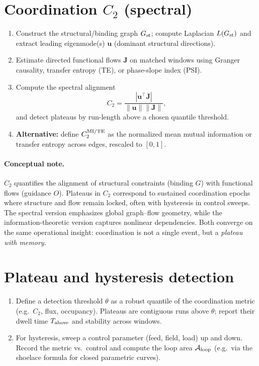 \documentclass[12pt,a4paper,oneside]{scrreprt}
\begin{document}
\section*{Coordination $C_2$ (spectral)}
\begin{enumerate}
\item Construct the structural/binding graph $G_{\rm st}$; compute Laplacian $L(G_{\rm st})$ and extract leading eigenmode(s) $\mathbf u$ (dominant structural directions).
\item Estimate directed functional flows $\mathbf J$ on matched windows using Granger causality, transfer entropy (TE), or phase-slope index (PSI).
\item Compute the spectral alignment
\[
C_2=\frac{|\mathbf u^\top\mathbf J|}{\|\mathbf u\|\|\mathbf J\|},
\]
and detect plateaus by run-length above a chosen quantile threshold.
\item \textbf{Alternative:} define $C_2^{\rm MI/TE}$ as the normalized mean mutual information or transfer entropy across edges, rescaled to $[0,1]$.
\end{enumerate}

\paragraph{Conceptual note.}
$C_2$ quantifies the alignment of structural constraints (binding $G$) with functional flows (guidance $O$).  
Plateaus in $C_2$ correspond to sustained coordination epochs where structure and flow remain locked, often with hysteresis in control sweeps.  
The spectral version emphasizes global graph–flow geometry, while the information-theoretic version captures nonlinear dependencies.  
Both converge on the same operational insight: coordination is not a single event, but a \emph{plateau with memory}.

\section*{Plateau and hysteresis detection}
\begin{enumerate}
\item Define a detection threshold $\theta$ as a robust quantile of the coordination metric (e.g.\ $C_2$, flux, occupancy). 
Plateaus are contiguous runs above $\theta$; report their dwell time $T_{\rm above}$ and stability across windows.
\item For hysteresis, sweep a control parameter (feed, field, load) up and down. 
Record the metric vs.\ control and compute the loop area $\mathcal A_{\rm loop}$ (e.g.\ via the shoelace formula for closed parametric curves).
\end{enumerate}
\end{document}
